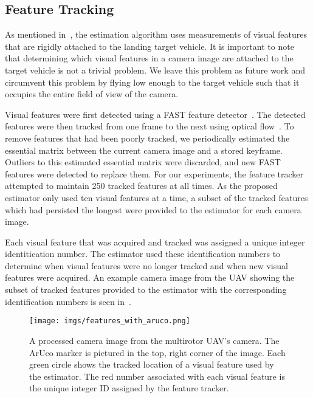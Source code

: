 
\subsection{Feature Tracking}
As mentioned in~,
the estimation algorithm uses measurements of visual features that are
rigidly attached to the landing target vehicle. It is important to note that
determining which visual features in a camera image are attached to
the target vehicle is not a trivial problem. We leave this problem as future work and
circumvent this problem by flying low enough to the target vehicle such that it
occupies the entire field of view of the camera.

Visual features were first detected using a FAST feature
detector~\cite{rosten2006machine}. The detected features were then tracked from one frame to
the next using optical flow~\cite{bouguet2001pyramidal}.
To remove features that had been poorly tracked, we periodically
estimated the essential matrix between the current camera image
and a stored keyframe.
Outliers to this estimated essential matrix were discarded, and new FAST
features were detected to replace them.
For our experiments, the feature tracker attempted to maintain 250
tracked features at all times. As the proposed estimator only used ten visual
features at a time,
a subset of the tracked features which had persisted the longest
were provided to the estimator for each camera image.

Each visual feature that was acquired and tracked was assigned a unique integer
identitication number. The estimator used these identification numbers to
determine when visual features were no longer tracked and when new visual
features were acquired.
An example camera image from the UAV showing the
subset of tracked features provided to the estimator with the corresponding
identification
numbers is seen in~.


\begin{figure}
  \centering
  \texttt{[image: imgs/features\_with\_aruco.png]}
  \caption[Visual Feature Tracking During Flight Experiment]{A processed camera image from the multirotor UAV's camera. The ArUco
  marker is pictured in the top, right corner of the image. Each green
circle shows the tracked location of a visual feature used by the
estimator. The red number associated with each visual feature is the unique
integer ID assigned by the feature tracker.}
  \label{fig:features_with_aruco}
\end{figure}
